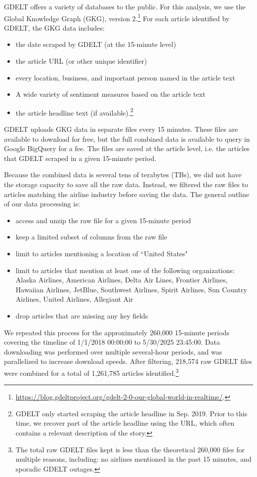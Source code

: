 \documentclass[12pt]{article}
\begin{document}
GDELT offers a variety of databases to the public. For this analysis, we use the Global Knowledge Graph (GKG), version 2.\footnote{\url{https://blog.gdeltproject.org/gdelt-2-0-our-global-world-in-realtime/}.} For each article identified by GDELT, the GKG data includes:
\begin{itemize}
\singlespacing
    \item the date scraped by GDELT (at the 15-minute level)
    \item the article URL (or other unique identifier)
    \item every location, business, and important person named in the article text
    \item A wide variety of sentiment measures based on the article text
    \item the article headline text (if available).\footnote{GDELT only started scraping the article headline in Sep. 2019. Prior to this time, we recover part of the article headline using the URL, which often contains a relevant description of the story.}
\end{itemize}
GDELT uploads GKG data in separate files every 15 minutes. These files are available to download for free, but the full combined data is available to query in Google BigQuery for a fee. The files are saved at the article level, i.e. the articles that GDELT scraped in a given 15-minute period.

Because the combined data is several tens of terabytes (TBs), we did not have the storage capacity to save all the raw data. Instead, we filtered the raw files to articles matching the airline industry before saving the data. The general outline of our data processing is:
\begin{itemize}
\singlespacing
    \item access and unzip the raw file for a given 15-minute period
    \item keep a limited subset of columns from the raw file
    \item limit to articles mentioning a location of ``United States"
    \item limit to articles that mention at least one of the following organizations: Alaska Airlines, American Airlines, Delta Air Lines, Frontier Airlines, Hawaiian Airlines, JetBlue, Southwest Airlines, Spirit Airlines, Sun Country Airlines, United Airlines, Allegiant Air
    \item drop articles that are missing any key fields
\end{itemize}
We repeated this process for the approximately 260,000 15-minute periods covering the timeline of 1/1/2018 00:00:00 to 5/30/2025 23:45:00. Data downloading was performed over multiple several-hour periods, and was parallelized to increase download speeds. After filtering, 218,574 raw GDELT files were combined for a total of 1,261,785 articles identified.\footnote{The total raw GDELT files kept is less than the theoretical 260,000 files for multiple reasons, including: no airlines mentioned in the past 15 minutes, and sporadic GDELT outages.}
\end{document}
